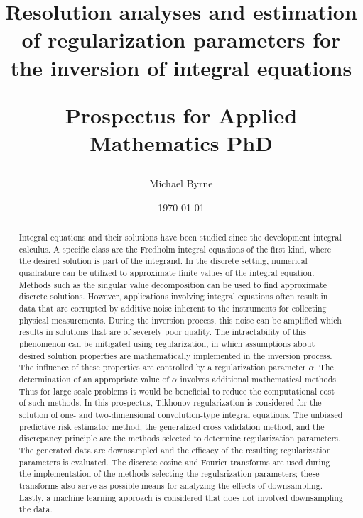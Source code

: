 \documentclass[12pt,notitlepage]{report}
\title{Resolution analyses and estimation of regularization parameters for the inversion of integral equations \\
\begin{large}
Prospectus for Applied Mathematics PhD
\end{large}}
\author{Michael Byrne}
\date{\today}
\newcommand{\regparam}{\alpha}
\begin{document}
\maketitle

\begin{abstract}
Integral equations and their solutions have been studied since the development integral calculus. A specific class are the Fredholm integral equations of the first kind, where the desired solution is part of the integrand. In the discrete setting, numerical quadrature can be utilized to approximate finite values of the integral equation. Methods such as the singular value decomposition can be used to find approximate discrete solutions. However, applications involving integral equations often result in data that are corrupted by additive noise inherent to the instruments for collecting physical measurements. During the inversion process, this noise can be amplified which results in solutions that are of severely poor quality. The intractability of this phenomenon can be mitigated using regularization, in which assumptions about desired solution properties are mathematically implemented in the inversion process. The influence of these properties are controlled by a regularization parameter $\regparam$. The determination of an appropriate value of $\regparam$ involves additional mathematical methods. Thus for large scale problems it would be beneficial to reduce the computational cost of such methods. In this prospectus, Tikhonov regularization is considered for the solution of one- and two-dimensional convolution-type integral equations. The unbiased predictive risk estimator method, the generalized cross validation method, and the discrepancy principle are the methods selected to determine regularization parameters. The generated data are downsampled and the efficacy of the resulting regularization parameters is evaluated. The discrete cosine and Fourier transforms are used during the implementation of the methods selecting the regularization parameters; these transforms also serve as possible means for analyzing the effects of downsampling. Lastly, a machine learning approach is considered that does not involved downsampling the data.
\end{abstract} 

\tableofcontents
\end{document}
